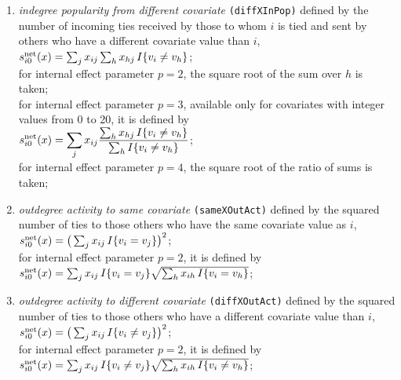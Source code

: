 \documentclass[a4paper,fleqn,11pt]{article}
\newcommand{\+}{\, + \,}
\newcommand{\vit}{\theenumi}
\begin{document}
\begin{enumerate}
 \item {\em indegree popularity from different covariate}
\texttt{(diffXInPop)} defined by the
 number of incoming ties received by those to whom $i$ is tied
 and sent by others who have a different covariate value than $i$,\\
 $s^{\rm net}_{i\vit}(x) = \sum_j x_{ij} \sum_h x_{hj}\, I\{v_i \neq v_h \} $;\\
 for internal effect parameter $p=2$, the square root of the sum over $h$ is taken;\\
 for internal effect parameter $p=3$, available only for
 covariates with integer values from 0 to 20, it is defined by\\
 $\displaystyle s^{\rm net}_{i\vit}(x) = \sum_j x_{ij} \frac{\sum_h x_{hj}\, I\{v_i \neq v_h \}}
                {\sum_h I\{v_i \neq v_h \}} $;\\
 for internal effect parameter $p=4$, the square root of the ratio of sums is taken;

 \item {\em outdegree activity to same covariate}
\texttt{(sameXOutAct)} defined by the
 squared number of ties to those
 others who have the same covariate value as $i$,\\
 $s^{\rm net}_{i\vit}(x) =  \big( \sum_j x_{ij} \, I\{v_i = v_j \}\big)^2 $;\\
 for internal effect parameter $p=2$, it is defined by\\
 $s^{\rm net}_{i\vit}(x) =  \sum_j x_{ij} \, I\{v_i = v_j \}
            \sqrt{\sum_h x_{ih}\, I\{v_i = v_h \}} $;\\

 \item {\em outdegree activity to different covariate}
\texttt{(diffXOutAct)} defined by the
 squared number of ties to those
 others who have a different covariate value than $i$,\\
 $s^{\rm net}_{i\vit}(x) = \big(\sum_j x_{ij} \,I\{v_i \neq v_j \}\big)^2 $;\\
 for internal effect parameter $p=2$, it is defined by\\
 $s^{\rm net}_{i\vit}(x) =  \sum_j x_{ij} \, I\{v_i \neq v_j \}
             \sqrt{\sum_h x_{ih}\, I\{v_i \neq v_h \}} $;\\



\end{enumerate}
\end{document}
